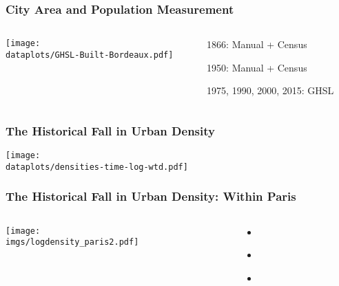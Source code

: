 \documentclass[aspectratio=169]{beamer}
\begin{document}
\begin{frame}[label=GHSL_measure]
\frametitle{City Area and Population Measurement}
\begin{columns}
\begin{column}{0.7\textwidth}
	\begin{adjustbox}{center}
	\texttt{[image: \\dataplots/GHSL-Built-Bordeaux.pdf]}\end{adjustbox}
	\end{column}
\begin{column}{0.3\textwidth}
\begin{midi}
\item 1866: Manual + Census
\item 1950: Manual + Census
\item 1975, 1990, 2000, 2015: GHSL
\item \hyperlink{GHSL}{}
\end{midi}
	
\end{column}
\end{columns}
\end{frame}

\begin{frame}[label=density]
\frametitle{The Historical Fall in Urban Density}
\texttt{[image: \\dataplots/densities-time-log-wtd.pdf]}
\end{frame}

\begin{frame}[label=Paris]
	\frametitle{The Historical Fall in Urban Density: Within Paris}
	\begin{columns}
		\begin{column}{0.9\textwidth}
			\texttt{[image: \\imgs/logdensity\_paris2.pdf]}
		\end{column}
		\begin{column}{0.2\textwidth}
		\begin{itemize}
		\item[] \hyperlink{violins}{}
		\item[] \hyperlink{Top5}{}
		\item[] \hyperlink{world_sample_city}{}
		\end{itemize}
		\end{column}
		\end{columns}
\end{frame}
\end{document}
